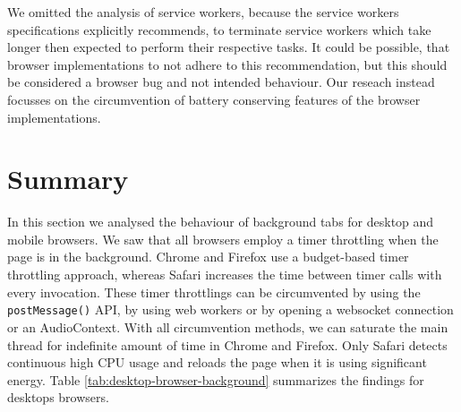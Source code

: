 \documentclass[
	ngerman,
	ruledheaders=section,%
	class=report,%
	thesis={type=bachelor},%
	accentcolor=9c,%
	custommargins=true,%
	marginpar=false,%
	parskip=half-,%
	fontsize=11pt,%
]{tudapub}
\begin{document}
  We omitted the analysis of service workers, because the service workers specifications explicitly recommends, to terminate service workers which take longer then expected to perform their respective tasks. It could be possible, that browser implementations to not adhere to this recommendation, but this should be considered a browser bug and not intended behaviour. Our reseach instead focusses on the circumvention of battery conserving features of the browser implementations.


  
  \section{Summary}

  In this section we analysed the behaviour of background tabs for desktop and mobile browsers. We saw that all browsers employ a timer throttling when the page is in the background. Chrome and Firefox use a budget-based timer throttling approach, whereas Safari increases the time between timer calls with every invocation. These timer throttlings can be circumvented by using the \texttt{postMessage()} API, by using web workers or by opening a websocket connection or an AudioContext. With all circumvention methods, we can saturate the main thread for indefinite amount of time in Chrome and Firefox. Only Safari detects continuous high CPU usage and reloads the page when it is using significant energy. Table \ref{tab:desktop-browser-background} summarizes the findings for desktops browsers.

  
\end{document}

